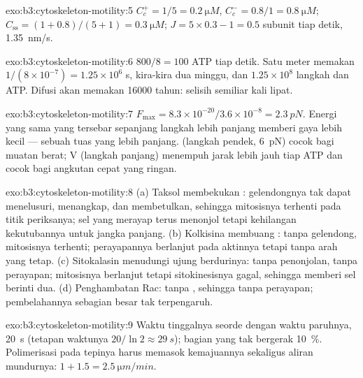 \begin{solution}{exo:b3:cytoskeleton-motility:5}
$C_{c}^{+} = 1/5 = \qty{0.2}{\micro M}$, $C_{c}^{-} = 0.8/1 =
\qty{0.8}{\micro M}$; $C_{\text{ss}} = (1 + 0.8)/(5 + 1) = \qty{0.3}{\micro
M}$; $J = 5\times 0.3 - 1 = 0.5$ subunit tiap detik, \qty{1.35}{nm/s}.
\end{solution}

\begin{solution}{exo:b3:cytoskeleton-motility:6}
$800/8 = 100$ ATP tiap detik. Satu meter memakan $1/(8\times 10^{-7}) =
1.25\times 10^{6}$ s, kira-kira dua minggu, dan $1.25\times 10^{8}$ langkah dan
ATP. Difusi akan memakan \num{16000} tahun: selisih semiliar kali lipat.
\end{solution}

\begin{solution}{exo:b3:cytoskeleton-motility:7}
$F_{\max} = 8.3\times 10^{-20}/3.6\times 10^{-8} = \qty{2.3}{pN}$. Energi yang
sama yang tersebar sepanjang langkah lebih panjang memberi gaya lebih kecil ---
sebuah tuas yang lebih panjang.  (langkah pendek, \qty{6}{pN}) cocok
bagi muatan berat;  V (langkah panjang) menempuh jarak lebih jauh tiap
ATP dan cocok bagi angkutan cepat yang ringan.
\end{solution}

\begin{solution}{exo:b3:cytoskeleton-motility:8}
(a) Taksol membekukan : gelendongnya tak dapat menelusuri,
menangkap, dan membetulkan, sehingga mitosisnya terhenti pada titik periksanya;
sel yang merayap terus menonjol tetapi kehilangan kekutubannya untuk jangka
panjang. (b) Kolkisina membuang : tanpa gelendong, mitosisnya
terhenti; perayapannya berlanjut pada aktinnya tetapi tanpa arah yang tetap.
(c) Sitokalasin menudungi ujung berdurinya: tanpa penonjolan, tanpa perayapan;
mitosisnya berlanjut tetapi sitokinesisnya gagal, sehingga memberi sel
berinti dua. (d) Penghambatan Rac: tanpa , sehingga tanpa
perayapan; pembelahannya sebagian besar tak terpengaruh.
\end{solution}

\begin{solution}{exo:b3:cytoskeleton-motility:9}
Waktu tinggalnya seorde dengan waktu paruhnya, \qty{20}{s} (tetapan waktunya
$20/\ln 2 \approx \qty{29}{s}$); bagian yang tak bergerak \qty{10}{\%}.
Polimerisasi pada tepinya harus memasok kemajuannya sekaligus aliran
mundurnya: $1 + 1.5 = \qty{2.5}{\micro m/min}$.
\end{solution}

